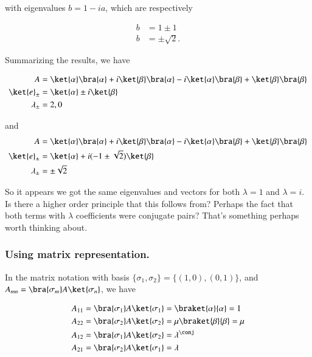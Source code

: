 with eigenvalues $b = 1 - i a$, which are respectively

\begin{align}\label{eqn:desaiDiracNotes:66j}
b &= 1 \pm 1 \\
b &= \pm \sqrt{2}.
\end{align}

Summarizing the results, we have

\begin{subequations}
\label{eqn:desaiDiracNotes:67ip}
\begin{align}
A &=
\ket{\alpha}\bra{\alpha}
+ i \ket{\beta}\bra{\alpha}
- i \ket{\alpha}\bra{\beta}
+ \ket{\beta}\bra{\beta} \\
\ket{e}_{\pm} &= \ket{\alpha} \pm i \ket{\beta} \\
\lambda_{\pm} &= 2, 0
\end{align}
\end{subequations}

and
\begin{subequations}
\label{eqn:desaiDiracNotes:67in}
\begin{align}
A &=
\ket{\alpha}\bra{\alpha}
+ i \ket{\beta}\bra{\alpha}
- i \ket{\alpha}\bra{\beta}
+ \ket{\beta}\bra{\beta} \\
\ket{e}_{\pm} &= \ket{\alpha} + i (-1 \pm \sqrt{2} ) \ket{\beta} \\
\lambda_{\pm} &= \pm \sqrt{2}
\end{align}
\end{subequations}

So it appears we got the same eigenvalues and vectors for both $\lambda = 1$ and $\lambda = i$.  Is there a higher order principle that this follows from?  Perhaps the fact that both terms with $\lambda$ coefficients were conjugate pairs?  That's something perhaps worth thinking about.

\subsubsection{Using matrix representation.}

In the matrix notation with basis $\{\sigma_1, \sigma_2\} = \{(1,0), (0,1)\}$, and $A_{mn} = \bra{\sigma_m} A \ket{\sigma_n}$, we have

\begin{align*}%
A_{11} &= \bra{\sigma_1} A \ket{\sigma_1} = \braket{\alpha}{\alpha} = 1 \\
A_{22} &= \bra{\sigma_2} A \ket{\sigma_2} = \mu \braket{\beta}{\beta} = \mu \\
A_{12} &= \bra{\sigma_1} A \ket{\sigma_2} = \lambda^\conj \\
A_{21} &= \bra{\sigma_2} A \ket{\sigma_1} = \lambda
\end{align*}

